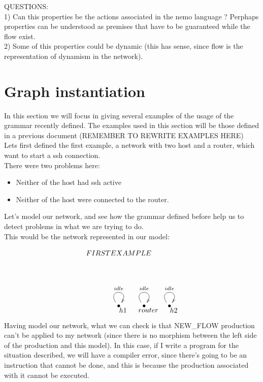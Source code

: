 \documentclass[envcountsect,runningheads]{llncs}
\begin{document}
\begin{itemize}
  QUESTIONS:\\
  1) Can this properties be the actions associated in the nemo language ? 
  Perphaps properties can be understood as premises that have to be guaranteed 
  while the flow exist. \\
  2) Some of this properties could be dynamic (this has sense, since flow is the representation 
  of dynamism in the network). \\
    
\end{itemize} 

\section{Graph instantiation}

In this section we will focus in giving several examples of the usage of the 
grammar recently defined. The examples used in this section will be those defined in 
a previous document (REMEMBER TO REWRITE EXAMPLES HERE) \\ 
Lets first defined the first example, a network with two host and a router, 
which want to start a ssh connection. \\
There were two problems here:
\begin{itemize}
  \item Neither of the host had ssh active
  \item Neither of the host were connected to the router.
\end{itemize}

Let's model our network, and see how the grammar defined before help us to 
detect problems in what we are trying to do.\\
This would be the network represented in our model:
\begin{figure}[H]
    \[
       \xymatrix@C=25pt@R=30pt
       {
         {}\POS[]-<0pc,0pc>\drop{FIRST EXAMPLE}
         \\
         \\
         {\bullet}\ar@(ul,ur)^{idle} \POS[]-<-.5pc,.5pc> \drop{h1} &
         {\bullet}\ar@(ul,ur)^{idle} \POS[]-<-.5pc,.5pc> \drop{router} &
         {\bullet}\ar@(ul,ur)^{idle} \POS[]-<-.5pc,.5pc> \drop{h2}
      }
    \]
\end{figure}

Having model our network, what we can check is that NEW\_FLOW production can't be 
applied to my network (since there is no morphism between the left side of the production 
and this model). In this case, if I write a program for the situation described, 
we will have a compiler error, since there's going to be an instruction that 
cannot be done, and this is because the production associated with it cannot be 
executed.
\end{document}

